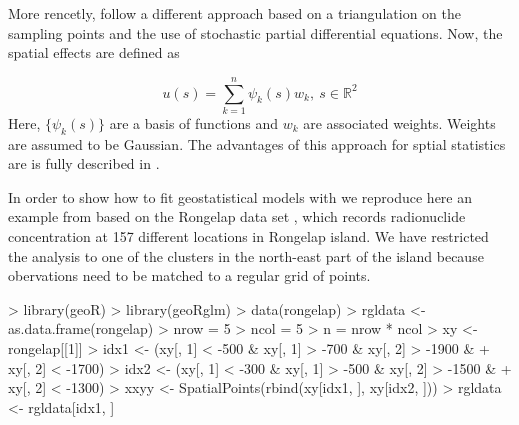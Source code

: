 \documentclass[article]{jss}
\begin{document}
More rencetly, \citet{Lindgren:2011} follow a different approach based on
a triangulation on the sampling points and the use of stochastic partial
differential equations. Now, the spatial effects are defined as

$$
u(s)=\sum_{k=1}^n \psi_k(s)w_k,\ s\in \mathbb{R}^2
$$
\noindent
Here, $\{\psi_k(s)\}$ are a basis of functions and $w_k$ are associated
weights. Weights are assumed to be Gaussian. The advantages of this approach
for sptial statistics are is fully described in \citet{Camelettietal:2011}.


In order to show how to fit geostatistical models with  we
reproduce here an example from \citet{GomezRubioetal:2013} based on the
Rongelap data set \citep{DiggleRibeiro:2007}, which records  radionuclide
concentration at 157 different locations in Rongelap island. We have restricted
the analysis to one of the clusters in the north-east part of the island
because obervations need to be matched to a regular grid of points.

\begin{Schunk}
\begin{Sinput}
> library(geoR)
> library(geoRglm)
> data(rongelap)
> rgldata <- as.data.frame(rongelap)
> nrow = 5
> ncol = 5
> n = nrow * ncol
> xy <- rongelap[[1]]
> idx1 <- (xy[, 1] < -500 & xy[, 1] > -700 & xy[, 2] > -1900 & 
+     xy[, 2] < -1700)
> idx2 <- (xy[, 1] < -300 & xy[, 1] > -500 & xy[, 2] > -1500 & 
+     xy[, 2] < -1300)
> xxyy <- SpatialPoints(rbind(xy[idx1, ], xy[idx2, ]))
> rgldata <- rgldata[idx1, ]
\end{Sinput}
\end{Schunk}

\begin{Schunk}
\end{Schunk}
\end{document}
